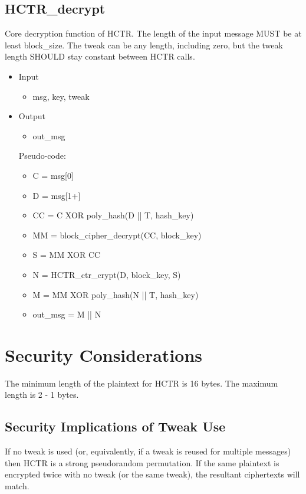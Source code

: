 \documentclass[i-d]{rfc}
\begin{document}
\subsection{HCTR\_decrypt}
Core decryption function of HCTR. The length of the input message MUST be at least block\_size. The tweak can be any length, including zero, but the tweak length SHOULD stay constant between HCTR calls.
\begin{itemize}
    \item Input
    \begin{itemize}
        \item msg, key, tweak
    \end{itemize}
    \item Output
    \begin{itemize}
        \item out\_msg
    \end{itemize}
    Pseudo-code:
    \begin{itemize}
        \item C = msg[0]
        \item D = msg[1+]
        \item CC = C XOR poly\_hash(D || T, hash\_key)
        \item MM = block\_cipher\_decrypt(CC, block\_key)
        \item S = MM XOR CC
        \item N = HCTR\_ctr\_crypt(D, block\_key, S)
        \item M = MM XOR poly\_hash(N || T, hash\_key)
        \item out\_msg = M || N
    \end{itemize}
\end{itemize}

\section{Security Considerations}
The minimum length of the plaintext for HCTR is 16 bytes. The maximum length is 2 - 1 bytes.

\subsection{Security Implications of Tweak Use}

If no tweak is used (or, equivalently, if a tweak is reused for multiple messages) then HCTR is a strong pseudorandom permutation. If the same plaintext is encrypted twice with no tweak (or the same tweak), the resultant ciphertexts will match.
\end{document}
